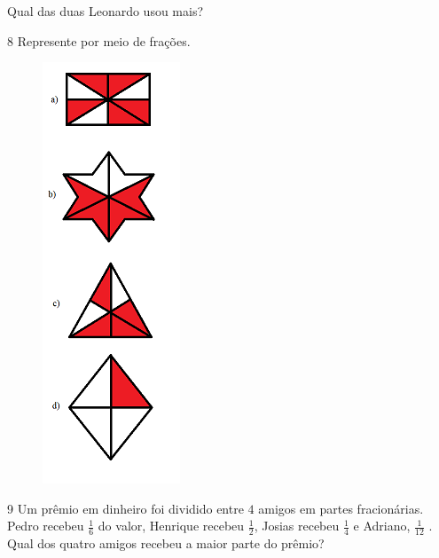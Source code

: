 Qual das duas Leonardo usou mais?


\num{8}  Represente por meio de frações.

\begin{figure}
\includegraphics[width=1.61458in,height=4.94792in]{./imgSAEB_6_MAT/media/image34.png}
\end{figure}

\begin{escolha}
\item {}
\item {}
\item {}
\item {}
\end{escolha}


\num{9} Um prêmio em dinheiro foi dividido entre $4$ amigos em partes
fracionárias. Pedro recebeu $\frac{1}{6}$ do valor, Henrique recebeu $\frac{1}{2}$, Josias
recebeu $\frac{1}{4}$ e Adriano, $\frac{1}{12}$ . Qual dos quatro amigos recebeu a maior
parte do prêmio?

